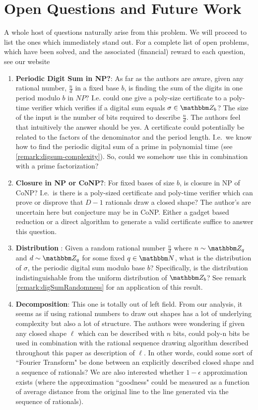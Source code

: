 \documentclass[11pt,titlepage]{article}
\begin{document}
\section{Open Questions and Future Work}
A whole host of questions naturally arise from this problem. We will proceed to list
the ones which immediately stand out. For a complete list of open problems, which have
been solved, and the associated (financial) reward to each question, see our website
\begin{enumerate}
  \item \textbf{Periodic Digit Sum in NP?}: As far as the authors are aware, given 
  any rational number, $\frac{n}{d}$ in a fixed base $b$, is finding the sum of the digits in
  one period modulo $b$ in $NP$? I.e. could one give a poly-size
  certificate to a poly-time verifier which verifies if a digital sum equals $\sigma \in \Z_b$?
  The size of the input is the number of bits required to describe $\frac{n}{d}$. The authors 
  feel that intuitively the answer should be yes. A certificate could potentially be related
  to the factors of the denominator and the period length. I.e.\ we know how to find
  the periodic digital sum of a prime in polynomial time (see \ref{remark:digsum-complexity}). So,
  could we somehow use this in combination with a prime factorization?

  \item \textbf{Closure in NP or CoNP?}: For fixed bases of size $b$, is closure in NP of CoNP?
  I.e.\ is there is a poly-sized certificate and poly-time verifier which can prove or disprove
  that $D-1$ rationals draw a closed shape? The author's are uncertain here but conjecture
  may be in CoNP. Either a gadget based reduction or a direct algorithm to generate a valid
  certificate suffice to answer this question.

  \item \textbf{Distribution }: Given a random rational number $\frac{n}{d}$
  where $n \sim \Z_q$ and $d \sim \Z_q$ for some fixed $q \in \N$, what is the distribution
  of $\sigma$, the periodic digital sum modulo base $b$? Specifically, is the distribution
  indistinguishable \cite{barak_2097} from the uniform distribution of $\Z_b$? 
  See remark \ref{remark:digSumRandomness} for an application of this result.

  \item \textbf{Decomposition}: This one is totally out of left field. From our analysis,
  it seems as if using rational numbers to draw out shapes has a lot of underlying complexity
  but also a lot of structure. The authors were wondering if given any closed shape $\ell$ which
  can be described with $n$ bits, could poly-n bits be used in combination with the rational
  sequence drawing algorithm described throughout this paper as description of $\ell$.
  In other words, could some sort of ``Fourier Transform" be done between an explicitly described
  closed shape and a sequence of rationals? We are also interested whether $1 - \epsilon$
  approximation exists 
  (where the approximation ``goodness" could be measured as a function of
  average distance from the original line to the line generated via the sequence of rationals).


\end{enumerate}
\end{document}
